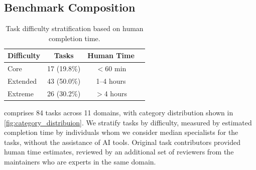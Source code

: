 


\subsection{Benchmark Composition}

\begin{table}[t]
\centering
\small
\caption{Task difficulty stratification based on human completion time.}
\label{tab:levels}
\begin{tabular}{lccc}
\toprule
\textbf{Difficulty} & \textbf{Tasks} & \textbf{Human Time}  \\
\midrule
Core & 17 (19.8\%) & $<$60 min\\
Extended & 43 (50.0\%) & 1--4 hours\\
Extreme & 26 (30.2\%) & $>$4 hours \\
\bottomrule
\end{tabular}
\end{table}



\benchmarkName{} comprises 84 tasks across 11 domains, with category distribution shown in \autoref{fig:category_distribuion}.
We stratify tasks by difficulty, measured by estimated completion time by individuals whom we consider median specialists for the tasks, without the assistance of AI tools. Original task contributors provided human time estimates, reviewed by an additional set of reviewers from the maintainers who are experts in the same domain.

